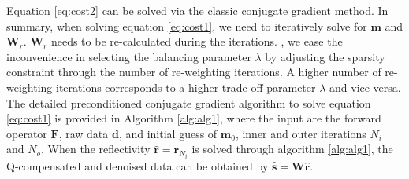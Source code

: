Equation \ref{eq:cost2} can be solved via the classic conjugate gradient method. In summary, when solving equation \ref{eq:cost1}, we need to iteratively solve for $\mathbf{m}$ and $\mathbf{W}_r$. $\mathbf{W}_r$ needs to be re-calculated during the iterations. , we ease the inconvenience in selecting the balancing parameter $\lambda$ by adjusting the sparsity constraint through the number of re-weighting iterations. A higher number of re-weighting iterations corresponds to a higher trade-off parameter $\lambda$ and vice versa. The detailed preconditioned conjugate gradient algorithm to solve equation \ref{eq:cost1} is provided in Algorithm \ref{alg:alg1}, where the input are the forward operator $\mathbf{F}$, raw data $\mathbf{d}$, and initial guess of $\mathbf{m}_0$, inner and outer iterations $N_i$ and $N_o$. When the  reflectivity $\hat{\mathbf{r}}=\mathbf{r}_{N_i}$ is solved through algorithm \ref{alg:alg1}, the Q-compensated and denoised data can be obtained by $\hat{\mathbf{s}} = \mathbf{W}\hat{\mathbf{r}}$.

